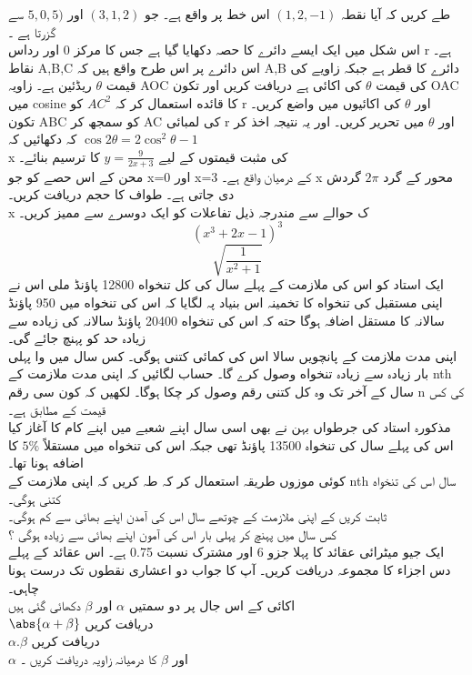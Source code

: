   طے کریں کہ آیا نقطہ
\((1,2,-1)\)
اس خط پر واقع ہے۔ جو
\((3,1,2)\)
اور
\(5,0,5)\)
سے گزرتا ہے ۔\\
اس شکل میں ایک ایسے دائرے کا حصہ دکھایا گیا ہے جس کا مرکز
0
اور رداس
r
ہے۔ نقاط
A,B,C
اس دائرے پر اس طرح واقع ہیں کہ
A,B
دائرے کا قطر ہے جبکہ زاویے کی قیمت
\(\theta\)
ریڈئین ہے۔
زاویہ
AOC
کی قیمت
\(\theta\)
کی اکائی ہے دریافت کریں اور تکون
OAC
میں
cosine
کا قائده استعمال کر کہ
\(AC^{2}\)
کو
r
اور
\(\theta\)
کی اکائیوں میں واضع کریں۔\\
تکون
ABC
کو سمجھ کر
AC
کی لمبائی
r
اور
\(\theta\)
میں تحریر کریں۔ اور یہ نتیجہ اخذ کر کہ دکھائیں کہ
\(\cos{2\theta}=2\cos^{2}\theta-1\)\\
x
کی مثبت قیمتوں کے لیے
\(y=\frac{9}{2x+3}\)
کا ترسیم بنائے۔\\
محن کے اس حصے کو جو
x=0
اور
x=3
کے درمیان واقع ہے۔
x
محور کے گرد
\(2\pi\)
گردش دی جاتی ہے۔ طواف کا حجم دریافت کریں۔\\
x
ک حوالے سے مندرجہ ذیل تفاعلات کو ایک دوسرے سے ممیز کریں۔\\
\[(x^{3}+2x-1)^{3}\]
\[\sqrt{\frac{1}{x^{2}+1}}\]
ایک استاد کو اس کی ملازمت کے پہلے سال کی کل تنخواه
12800
پاؤنڈ ملی اس نے اپنی مستقبل کی تنخواه کا تخمینہ اس بنیاد پہ لگایا کہ اس کی تنخواه میں
950
پاؤنڈ سالانہ کا مستقل اضافہ ہوگا حته کہ اس کی تنخواه
20400
پاؤنڈ سالانہ کی زیاده سے زیادہ حد کو پہنچ جائے گی۔\\
اپنی مدت ملازمت کے پانچویں سالا اس کی کمائی کتنی ہوگی۔
کس سال میں وا پہلی بار زیادہ سے زیادہ تنخواه وصول کرے گا۔
حساب لگائیں کہ اپنی مدت ملازمت کے
nth
سال کے آخر تک وہ کل کتنی رقم وصول کر چکا ہوگا۔ لکھیں کہ کون سی رقم
n
کی کس قیمت کے مطابق ہے۔\\
مذکورہ استاد کی جرطواں بہن نے بھی اسی سال اپنے شعبے میں اپنے کام کا آغاز کیا اس کی پہلے سال کی تنخواہ
13500
پاؤنڈ تھی جبکہ اس کی تنخواه میں مستقلاً
\(5\%\)
کا اضافه ہونا تھا۔\\
کوئی موزوں طریقہ استعمال کر کہ طہ کریں کہ اپنی ملازمت کے
nth
سال اس کی تنخواه کتنی ہوگی۔\\
ثابت کریں کے اپنی ملازمت کے چوتھے سال اس کی آمدن اپنے بھائی سے کم ہوگی۔\\
کس سال میں پہنچ کر پہلی بار اس کی آمون اپنے بھائی سے زیادہ ہوگی ؟\\
ایک جیو میٹرائی عقائد کا پہلا جزو
6
اور مشترک نسبت
0.75
ہے۔ اس عقائد کے پہلے دس اجزاء کا مجموعہ دریافت کریں۔ آپ کا جواب دو اعشاری نقطوں تک درست ہونا چاہی۔\\
اکائی کے اس جال پر دو سمتیں
\(\alpha\)
اور
\(\beta\)
دکھائی گئی ہیں \\
\(\abs{\alpha+\beta}\)
دریافت کریں \\
\(\alpha.\beta\)
دریافت کریں \\
\(\alpha\)
اور
\(\beta\)
کا درمیانہ زاویہ دریافت کریں ۔\\
